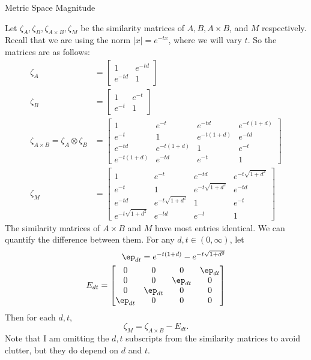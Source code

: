 \documentclass[12pt]{pom_thesis}
\begin{document}
\begin{chapter}{Metric Space Magnitude}
\begin{examp}
Let $\zeta_A, \zeta_B, \zeta_{A \times B}, \zeta_M$ be the similarity matrices of $A, B, A \times B$, and $M$ respectively. Recall that we are using the norm $|x| = e^{-tx}$, where we will vary $t$. So the matrices are as follows:
\begin{align*}
\zeta_A &= 
\begin{bmatrix}
1 & e^{-td} \\
e^{-td} & 1
\end{bmatrix}\\
\zeta_B &= 
\begin{bmatrix}
1 & e^{-t} \\
e^{-t} & 1
\end{bmatrix}\\
\zeta_{A \times B} = \zeta_A \otimes \zeta_B &= 
\begin{bmatrix}
1 & e^{-t} & e^{- td} & e^{-t(1 + d)}\\
e^{-t} & 1 & e^{-t(1 + d)}& e^{- td}\\
e^{-td} & e^{-t(1 + d)} & 1 & e^{-t}\\
e^{-t(1 + d)} & e^{-td} & e^{-t} & 1
\end{bmatrix}\\
\zeta_M &= 
\begin{bmatrix}
1 & e^{-t} & e^{- td} & e^{-t\sqrt{1 + d^2}}\\
e^{-t} & 1 &  e^{-t\sqrt{1 + d^2}}& e^{- td}\\
e^{-td} &  e^{-t\sqrt{1 + d^2}} & 1 & e^{-t}\\
 e^{-t\sqrt{1 + d^2}}& e^{-td} & e^{-t} & 1
\end{bmatrix}
\end{align*}
The similarity matrices of $A \times B$ and $M$ have most entries identical. We can quantify the difference between them. For any $d, t \in (0, \infty)$, let 
\begin{align*}
\ep_{dt} = e^{-t(1 + d)} - e^{-t\sqrt{1 + d^2}}\\
E_{dt} = \begin{bmatrix}
0 & 0 & 0 & \ep_{dt} \\
0 & 0 & \ep_{dt} & 0 \\
0 & \ep_{dt} & 0 & 0 \\
\ep_{dt} & 0 & 0 & 0
\end{bmatrix}
\end{align*}
Then for each $d,t$,
\[
\zeta_M = \zeta_{A \times B} - E_{dt}.
\]
Note that I am omitting the $d,t$ subscripts from the similarity matrices to avoid clutter, but they do depend on $d$ and $t$.


\end{examp}
\end{chapter}
\end{document}
